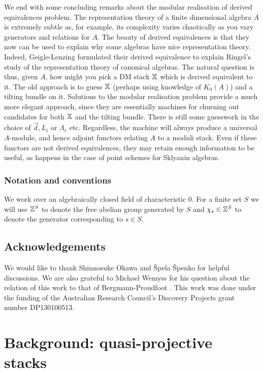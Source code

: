 \documentclass[12pt]{amsart}
\begin{document}
We end with some concluding remarks about the modular realisation of derived equivalences problem. The representation theory of a finite dimensional algebra $A$ is extremely subtle as, for example, its complexity varies chaotically as you vary generators and relations for $A$. The beauty of derived equivalences is that they now can be used to explain why some algebras have nice representation theory. Indeed, Geigle-Lenzing formulated their derived equivalence to explain Ringel's study of the representation theory of canonical algebras. The natural question is thus, given $A$, how might you pick a DM stack $\mathbb{X}$ which is derived equivalent to it. The old approach is to guess $\mathbb{X}$ (perhaps using knowledge of $K_0(A)$) and a tilting bundle on it. Solutions to the modular realisation problem provide a much more elegant approach, since they are essentially machines for churning out candidates for both $\mathbb{X}$ and the tilting bundle. There is still some guesswork in the choice of $\vec{d}, L_i$ or $\Lambda_r$ etc. Regardless, the machine will always produce a universal $A$-module, and hence adjoint functors relating $A$ to a moduli stack. Even if these functors are not derived equivalences, they may retain enough information to be useful, as happens in the case of point schemes for Sklyanin algebras.  

\subsubsection*{Notation and conventions}
We work over an algebraically closed field of characteristic 0.
For a finite set $S$ we will use $\mathbb{Z}^S$ to denote the free abelian group generated by $S$ and $\chi_s \in \mathbb{Z}^S$ to denote the generator corresponding to $s \in S$.

\subsection*{Acknowledgements}
We would like to thank Shinnosuke Okawa and \v{S}pela \v{S}penko for helpful discussions.
We are also grateful to Michael Wemyss for his question about the relation of this work to that of Bergmann-Proudfoot \cite{MR2421120}.
This work was done under the funding of the Australian Research Council's Discovery Projects grant number DP130100513.

\section{Background: quasi-projective stacks}
\end{document}

